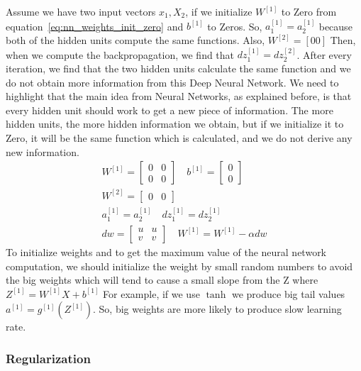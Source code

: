 Assume  we have two input vectors $x_1,X_2$, if we initialize $W^{[1]}$ to Zero from equation~\eqref{eq:nn_weights_init_zero} and $b^{[1]}$ to Zeros. So, $a_1^{[1]}=a_2^{[1]}$ because both of the hidden units compute the same functions. Also, $W^{[2]}=[0 0]$ Then, when we compute the backpropagation, we find that $dz_1^{[1]}=dz_2^{[2]}$. After every iteration, we find that the two hidden units calculate the same function and we do not obtain more information from this Deep Neural Network. We need to highlight that the main idea from Neural Networks, as explained before, is that every hidden unit should work to get a new piece of information. The more hidden units, the more hidden information we obtain, but if we initialize it to Zero, it will be the same function which is calculated, and we do not derive any new information.%
%
\begin{subequations}\label{eq:nn_weights_init_zero}
\begin{align}
 W^{[1]} = \begin{bmatrix} 0 & 0\\ 0 & 0 \end{bmatrix} \quad b^{[1]} = \begin{bmatrix} 0 \\ 0 \end{bmatrix} \\
 W^{[2]} = \begin{bmatrix} 0 & 0 \end{bmatrix} \\
 a_1^{[1]} = a_2^{[1]} \quad   dz_1^{[1]} = dz_2^{[1]}\\
 dw = \begin{bmatrix} u & u \\ v & v \end{bmatrix} \quad W^{[1]} = W^{[1]} - \alpha dw
\end{align}
\end{subequations}%
%
To initialize weights and to get the maximum value of the neural network computation, we should initialize the weight by small random numbers to avoid the big weights which will tend to cause a small slope from the Z where $Z^{[1]}= W^{[1]} X + b^{[1]}$ For example, if we use $\tanh$ we produce big tail values $a^{[1]}= g^{[1]}(Z^{[1]})$. So, big weights are more likely to produce slow learning rate. 

\subsubsection{Regularization}

